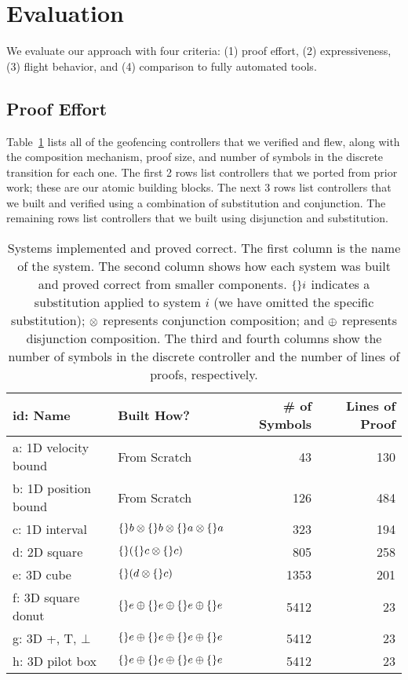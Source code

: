 \section{Evaluation}
\label{sec:eval}
We evaluate our approach with four criteria: (1) proof effort, (2)
expressiveness, (3) flight behavior, and (4) comparison to fully automated
tools.

\subsection{Proof Effort}
Table~\ref{fig:monitors} lists all of the geofencing controllers that we
verified and flew, along with the composition mechanism, proof size, and
number of symbols in the discrete transition for each one.  The first 2
rows list controllers that we ported from prior work; these are our atomic
building blocks.  The next 3 rows list controllers that we built and
verified using a combination of substitution and conjunction.  The
remaining rows list controllers that we built using disjunction and
substitution.

\begin{table}
\caption[Systems implemented and proved correct.]{Systems implemented and proved correct. The first column is the name of the system. The second column shows how each system was built and proved correct from smaller components. $\{\}i$ indicates a substitution applied to system $i$ (we have omitted the specific substitution); $\otimes$ represents conjunction composition; and $\oplus$ represents disjunction composition. The third and fourth columns show the number of symbols in the discrete controller and the number of lines of proofs, respectively.}
\label{fig:monitors}
\begin{tabular}{l|l|r|r}
id: Name & Built How? & \# of Symbols & Lines of Proof \\
\hline 
a: 1D velocity bound & From Scratch & 43 & 130 \\
b: 1D position bound & From Scratch & 126 & 484 \\
c: 1D interval & $\{\}b \otimes \{\}b \otimes \{\}a \otimes \{\}a$ & 323 & 194 \\
d: 2D square & $\{\}(\{\}c \otimes \{\}c)$ & 805 & 258 \\
e: 3D cube & $\{\}(d \otimes \{\}c)$ & 1353 & 201 \\
f: 3D square donut & $\{\}e\oplus\{\}e\oplus\{\}e\oplus\{\}e$ & 5412 & 23 \\
g: 3D +, T, $\bot$ & $\{\}e\oplus\{\}e\oplus\{\}e\oplus\{\}e$ & 5412 & 23 \\
h: 3D pilot box & $\{\}e\oplus\{\}e\oplus\{\}e\oplus\{\}e$ & 5412 & 23 \\
\end{tabular}
\end{table}

